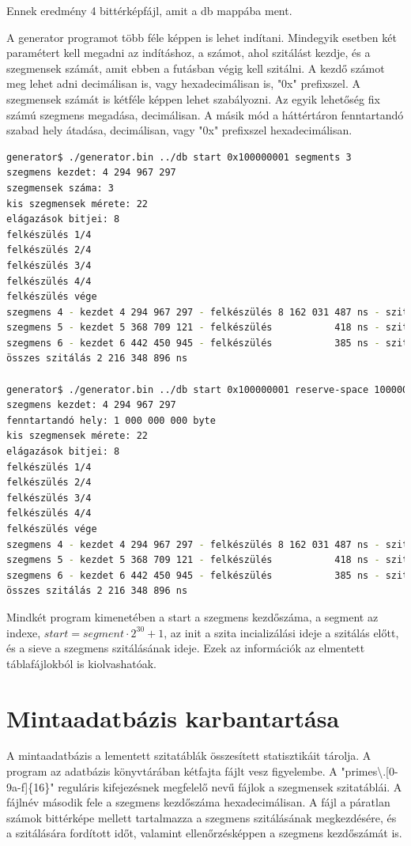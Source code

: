 \documentclass[12pt]{report}
\begin{document}
Ennek eredmény 4 bittérképfájl, amit a db mappába ment.

A generator programot több féle képpen is lehet indítani.
Mindegyik esetben két paramétert kell megadni az indításhoz,
a számot, ahol szitálást kezdje, és a szegmensek számát, amit
ebben a futásban végig kell szitálni.
A kezdő számot meg lehet adni decimálisan is, vagy hexadecimálisan is,
"0x" prefixszel. A szegmensek számát is kétféle képpen lehet szabályozni.
Az egyik lehetőség fix számú szegmens megadása, decimálisan.
A másik mód a háttértáron fenntartandó szabad hely átadása, decimálisan,
vagy "0x" prefixszel hexadecimálisan.

{\tiny
\begin{lstlisting}[language=bash]
generator$ ./generator.bin ../db start 0x100000001 segments 3
szegmens kezdet: 4 294 967 297
szegmensek száma: 3
kis szegmensek mérete: 22
elágazások bitjei: 8
felkészülés 1/4
felkészülés 2/4
felkészülés 3/4
felkészülés 4/4
felkészülés vége
szegmens 4 - kezdet 4 294 967 297 - felkészülés 8 162 031 487 ns - szitálás 729 914 370 ns
szegmens 5 - kezdet 5 368 709 121 - felkészülés           418 ns - szitálás 736 412 117 ns
szegmens 6 - kezdet 6 442 450 945 - felkészülés           385 ns - szitálás 750 022 409 ns
összes szitálás 2 216 348 896 ns

generator$ ./generator.bin ../db start 0x100000001 reserve-space 1000000000
szegmens kezdet: 4 294 967 297
fenntartandó hely: 1 000 000 000 byte 
kis szegmensek mérete: 22
elágazások bitjei: 8
felkészülés 1/4
felkészülés 2/4
felkészülés 3/4
felkészülés 4/4
felkészülés vége
szegmens 4 - kezdet 4 294 967 297 - felkészülés 8 162 031 487 ns - szitálás 729 914 370 ns
szegmens 5 - kezdet 5 368 709 121 - felkészülés           418 ns - szitálás 736 412 117 ns
szegmens 6 - kezdet 6 442 450 945 - felkészülés           385 ns - szitálás 750 022 409 ns
összes szitálás 2 216 348 896 ns
\end{lstlisting}
}

Mindkét program kimenetében a start a szegmens kezdőszáma, a segment az indexe,
$start=segment \cdot 2^{30}+1$, az init a szita incializálási ideje a szitálás előtt,
és a sieve a szegmens szitálásának ideje. Ezek az információk az elmentett
táblafájlokból is kiolvashatóak.

\section{Mintaadatbázis karbantartása}

A mintaadatbázis a lementett szitatáblák összesített statisztikáit tárolja.
A program az adatbázis könyvtárában kétfajta fájlt vesz figyelembe.
A "primes\textbackslash.[0-9a-f]\{16\}" reguláris kifejezésnek megfelelő nevű
fájlok a szegmensek szitatáblái.
A fájlnév második fele a szegmens kezdőszáma hexadecimálisan.
A fájl a páratlan számok bittérképe mellett tartalmazza a szegmens
szitálásának megkezdésére, és a szitálására fordított időt,
valamint ellenőrzésképpen a szegmens kezdőszámát is.
\end{document}
